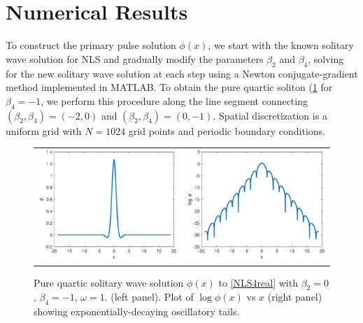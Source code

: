 \documentclass[12pt]{article}
\begin{document}
\section{Numerical Results}

To construct the primary pulse solution $\phi(x)$, we start with the known solitary wave solution for NLS and gradually modify the parameters $\beta_2$ and $\beta_4$, solving for the new solitary wave solution at each step using a Newton conjugate-gradient method \cite[Chapter 7.2.4]{YangCh7} implemented in MATLAB. To obtain the pure quartic soliton (\cref{fig:PQS} for $\beta_4 = -1$, we perform this procedure along the line segment connecting $(\beta_2, \beta_4) = (-2, 0)$ and $(\beta_2, \beta_4) = (0, -1)$. Spatial discretization is a uniform grid with $N = 1024$ grid points and periodic boundary conditions.

\begin{figure}[H]
\centering
\begin{tabular}{cc}
\includegraphics[width=8cm]{images/PQS1.eps} &
\includegraphics[width=8cm]{images/PQS1log.eps}
\end{tabular}
\caption{Pure quartic solitary wave solution $\phi(x)$ to \cref{NLS4real} with $\beta_2 = 0$, $\beta_4 = -1$, $\omega = 1$. (left panel). Plot of $\log \phi(x)$ vs $x$ (right panel) showing exponentially-decaying oscillatory tails. }
\label{fig:PQS}
\end{figure} 
\end{document}
